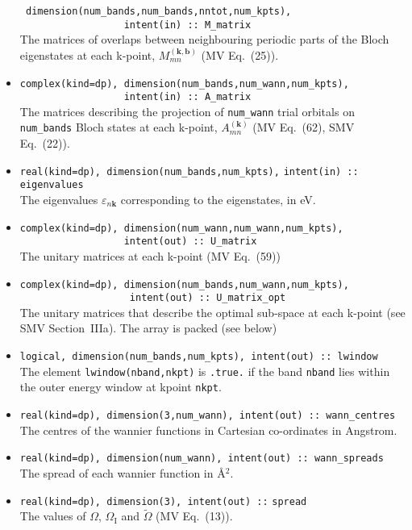 \begin{itemize}
      \verb# dimension(num_bands,num_bands,nntot,num_kpts),#\\
      \verb#                  intent(in) :: M_matrix#\\ 
      The matrices of overlaps between neighbouring periodic parts of
      the Bloch eigenstates at each k-point, $M_{mn}^{(\mathbf{k,b})}$
      (MV Eq.~(25)).
\item \verb#complex(kind=dp), dimension(num_bands,num_wann,num_kpts),#\\
      \verb#                  intent(in) :: A_matrix# \\The matrices
      describing the projection of \verb#num_wann# trial orbitals on
      \verb#num_bands# Bloch states at each k-point,
      $A_{mn}^{(\mathbf{k})}$ (MV Eq.~(62), SMV Eq.~(22)).
\item \verb#real(kind=dp), dimension(num_bands,num_kpts),#
      \verb#intent(in) :: eigenvalues#\\ The
      eigenvalues $\varepsilon_{n\mathbf{k}}$ corresponding to the
      eigenstates, in eV.
\item \verb#complex(kind=dp), dimension(num_wann,num_wann,num_kpts),#\\
      \verb#                  intent(out) :: U_matrix#\\ The unitary
      matrices at each k-point (MV Eq.~(59))
\item \verb#complex(kind=dp), dimension(num_bands,num_wann,num_kpts),#\\
      \verb#                   intent(out) :: U_matrix_opt#\\ The
      unitary matrices that describe the optimal sub-space at each
      k-point (see SMV Section~{\sc IIIa}). The array is packed (see below)
\item \verb#logical, dimension(num_bands,num_kpts), intent(out) :: lwindow#\\ 
       The element \verb#lwindow(nband,nkpt)# is {\tt .true.} if the band
{\tt nband} lies within the outer energy window at kpoint {\tt nkpt}.
\item \verb#real(kind=dp), dimension(3,num_wann), intent(out) :: wann_centres#\\ 
      The centres of the wannier
      functions in Cartesian co-ordinates in Angstrom. 
\item \verb#real(kind=dp), dimension(num_wann), intent(out) :: wann_spreads#\\ 
      The spread of each wannier function in \AA$^{2}$.
\item \verb#real(kind=dp), dimension(3), intent(out) ::#
      \verb#spread#\\ 
      The values of $\Omega$, $\Omega_{\mathrm{I}}$ and
      $\tilde{\Omega}$ (MV Eq.~(13)). 
\end{itemize}

